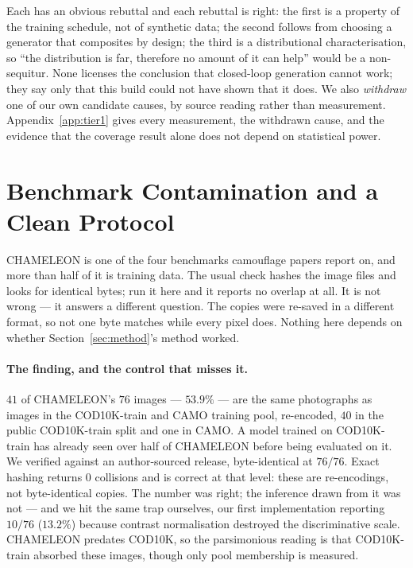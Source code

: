 \documentclass{article} %
\begin{document}
Each has an obvious rebuttal and each rebuttal is right: the first is a property of the training
schedule, not of synthetic data; the second follows from choosing a generator that composites by
design; the third is a distributional characterisation, so ``the distribution is far, therefore no
amount of it can help'' would be a non-sequitur. None licenses the conclusion that closed-loop
generation cannot work; they say only that this build could not have shown that it does. We also
\emph{withdraw} one of our own candidate causes, by source reading rather than measurement.
Appendix~\ref{app:tier1} gives every measurement, the withdrawn cause, and the evidence that the
coverage result alone does not depend on statistical power.

\section{Benchmark Contamination and a Clean Protocol}
\label{sec:contamination}

CHAMELEON is one of the four benchmarks camouflage papers report on, and more than half of it is
training data. The usual check hashes the image files and looks for identical bytes; run it here and
it reports no overlap at all. It is not wrong --- it answers a different question. The copies were
re-saved in a different format, so not one byte matches while every pixel does. Nothing here depends
on whether Section~\ref{sec:method}'s method worked.

\paragraph{The finding, and the control that misses it.} $41$ of CHAMELEON's $76$ images ---
$53.9\%$ --- are the same photographs as images in the COD10K-train and CAMO training pool,
re-encoded, $40$ in the public COD10K-train split and one in CAMO. A model trained on COD10K-train
has already seen over half of CHAMELEON before being evaluated on it. We verified against an author-sourced release, byte-identical at $76/76$. Exact hashing returns $0$
collisions and is correct at that level: these are re-encodings, not byte-identical copies. The
number was right; the inference drawn from it was not --- and we hit the same trap ourselves, our
first implementation reporting $10/76$ ($13.2\%$) because contrast normalisation destroyed the
discriminative scale. CHAMELEON predates COD10K, so the parsimonious reading is that COD10K-train
absorbed these images, though only pool membership is measured.
\end{document}
